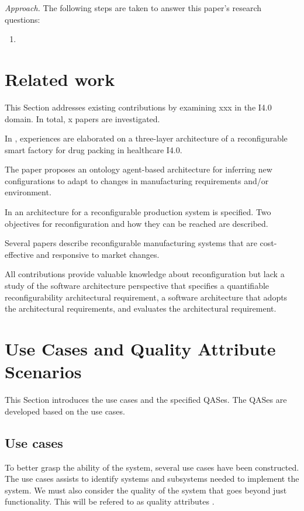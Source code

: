 \documentclass[conference]{IEEEtran}
\begin{document}
\emph{Approach.}
The following steps are taken to answer this paper's research questions:
\begin{enumerate}
    \item
\end{enumerate}



\section{Related work}
\label{sec:related_work}
This Section addresses existing contributions by examining xxx in the I4.0 domain.
In total, x papers are investigated.

In \cite{Wan2019Reconfigurable}, experiences are elaborated on a three-layer architecture of a reconfigurable smart factory for drug packing in healthcare I4.0.


The paper \cite{Yazen2010Ontology} proposes an ontology agent-based architecture for inferring  new configurations to adapt to changes in manufacturing requirements and/or environment.



In \cite{Leitao2016Specification,Angione2017Integration} an architecture for a reconfigurable production system is specified.
Two objectives for reconfiguration and how they can be reached are described.


Several papers \cite{Koren1999Reconfigurable,Koren2010Design,Bortolini2018Reconfigurable} describe reconfigurable manufacturing systems that are cost-effective and responsive to market changes.

All contributions provide valuable knowledge about reconfiguration but lack a study of the software architecture perspective that specifies a quantifiable reconfigurability architectural requirement, a software architecture that adopts the architectural requirements, and evaluates the architectural requirement.



\section{Use Cases and Quality Attribute Scenarios}
\label{sec:use_case_and_qas}
This Section introduces the use cases and the specified QASes.
The QASes are developed based on the use cases.



\subsection{Use cases}
\label{sec:use_case}
To better grasp the ability of the system, several use cases have been constructed. The use cases assists to identify systems and subsystems needed to implement the system.
We must also consider the quality of the system that goes beyond just functionality. This will be refered to as quality attributes \cite{bass2021software}.
\end{document}
